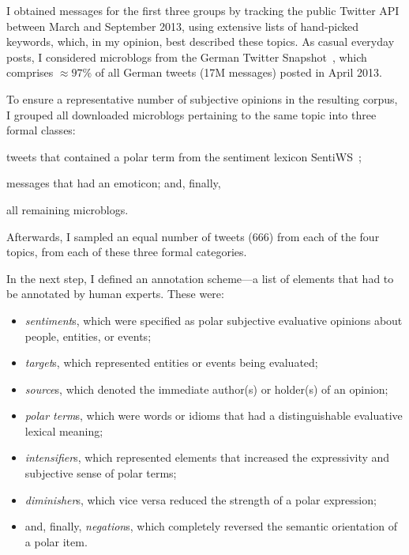 \documentclass[11pt]{article}
\renewcommand{\cite}{\citep}
\begin{document}
I obtained messages for the first three groups by tracking the public
Twitter API between March and September 2013, using extensive lists of
hand-picked keywords, which, in my opinion, best described these
topics.  As casual everyday posts, I considered microblogs from the
German Twitter Snapshot~\cite{Scheffler:14}, which comprises
$\approx97\%$ of all German tweets (17M messages) posted in April
2013.

To ensure a representative number of subjective opinions in the
resulting corpus, I grouped all downloaded microblogs pertaining to
the same topic into three formal classes:
\begin{inparaenum}[(i)]
  \item tweets that contained a polar term from the sentiment lexicon
    SentiWS~\cite{Remus:10};
  \item messages that had an emoticon; and, finally,
  \item all remaining microblogs.
\end{inparaenum}
Afterwards, I sampled an equal number of tweets (666) from each of the
four topics, from each of these three formal categories.

In the next step, I defined an annotation scheme---a list of elements
that had to be annotated by human experts.  These were:
\begin{itemize}
  \item\emph{sentiment}s, which were specified as polar subjective
    evaluative opinions about people, entities, or events;

  \item\emph{target}s, which represented entities or events being
    evaluated;

  \item\emph{source}s, which denoted the immediate author(s) or
    holder(s) of an opinion;

  \item\emph{polar term}s, which were words or idioms that had a
    distinguishable evaluative lexical meaning;

  \item\emph{intensifier}s, which represented elements that increased
    the expressivity and subjective sense of polar terms;

  \item\emph{diminisher}s, which vice versa reduced the strength of a
    polar expression;

  \item and, finally, \emph{negation}s, which completely reversed the
    semantic orientation of a polar item.
\end{itemize}
\end{document}
